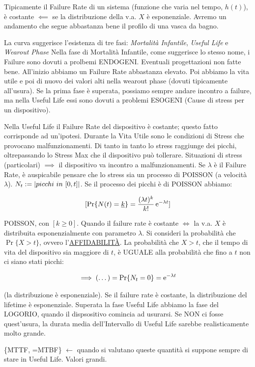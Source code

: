 Tipicamente il Failure Rate di un sistema (funzione che varia nel tempo, $h(t)$), è costante $\impliedby$ se la distribuzione della v.a. $X$ è esponenziale. 
Avremo un andamento che segue abbastanza bene il profilo di una vasca da bagno.

La curva suggerisce l'esistenza di tre fasi: \textit{Mortalità Infantile}, \textit{Useful Life} e \textit{Wearout Phase} Nella fase di Mortalità Infantile, come suggerisce lo stesso nome, i Failure sono dovuti a prolbemi ENDOGENI. Eventuali progettazioni non fatte bene. All'inizio abbiamo un Failure Rate abbastanza elevato. Poi abbiamo la vita utile e poi di nuovo dei valori alti nella wearout phase (dovuti tipicamente all'usura). Se la prima fase è superata, possiamo sempre andare incontro a failure, ma nella Useful Life essi sono dovuti a problemi ESOGENI (Cause di stress per un dispositivo).

Nella Useful Life il Failure Rate del dispositivo è costante; questo fatto corrisponde ad un'ipotesi. Durante la Vita Utile sono le condizioni di Stress che provocano malfunzionamenti. Di tanto in tanto lo stress raggiunge dei picchi, oltrepassando lo Stress Max che il dispositivo può tollerare. Situazioni di stress (particolari) $\implies$ il dispositivo va incontro a malfunzionamenti. Se $\lambda$ è il Failure Rate, è auspicabile pensare che lo stress sia un processo di POISSON (a velocità $\lambda$). $N_t := \cardinality{picchi\ in\ [0,t]}$. Se il processo dei picchi è di POISSON abbiamo:

\[
	[\Pr\{N(t) = \underline{k}\} = \frac{(\lambda t)^k}{k!}\mathop{}\!\mathrm{e}^{-\lambda t}]
\]

POISSON, con $[k\geq 0]$. Quando il failure rate è costante $\iff$ la v.a. $X$ è distribuita esponenzialmente con parametro $\lambda$. Si consideri la probabilità che $\Pr\{X > t\}$, ovvero l'\underline{AFFIDABILIT\`A}. La probabilità che $X > t$, che il tempo di vita del dispositivo sia maggiore di $t$, è UGUALE alla probabilità che fino a $t$ non ci siano stati picchi:

\[
	\implies (\dots) = \Pr\{N_t = 0\} = \mathop{}\!\mathrm{e}^{-\lambda t}
\]

(la distribuzione è esponenziale). Se il failure rate è costante, la distribuzione del lifetime è esponenziale. Superata la fase Useful Life abbiamo la fase del LOGORIO, quando il dispsositivo comincia ad usurarsi. Se NON ci fosse quest'usura, la durata media dell'Intervallo di Useful Life sarebbe realisticamente molto grande.

\{MTTF, =MTBF\} $\leftarrow$ quando si valutano queste quantità si suppone sempre di stare in Useful Life. Valori grandi. 

